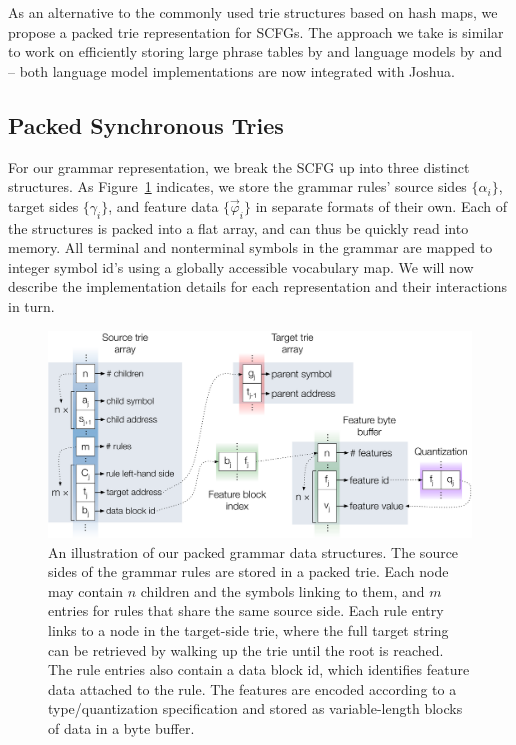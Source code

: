 \documentclass[11pt]{article}
\begin{document}
As an alternative to the commonly used trie structures based on hash
maps, we propose a packed trie representation for SCFGs. The approach
we take is similar to work on efficiently storing large phrase tables
by  and language models by  and
 -- both language model implementations are now
integrated with Joshua.

\subsection{Packed Synchronous Tries}

For our grammar representation, we break the SCFG up into three
distinct structures. As Figure~\ref{fig-packed-structure} indicates,
we store the grammar rules' source sides $\{\alpha_i\}$, target sides
$\{\gamma_i\}$, and feature data $\{\vec{\varphi}_i\}$ in separate
formats of their own. Each of the structures is packed into a flat
array, and can thus be quickly read into memory. All terminal and
nonterminal symbols in the grammar are mapped to integer symbol id's
using a globally accessible vocabulary map. We will now describe the
implementation details for each representation and their interactions
in turn.

\begin{figure}[!th]
\begin{center}
\includegraphics[width=0.9\linewidth]{figures/packed_structure.pdf}
\end{center}
\caption{An illustration of our packed grammar data structures. The
  source sides of the grammar rules are stored in a packed trie. Each
  node may contain $n$ children and the symbols linking to them, and
  $m$ entries for rules that share the same source side. Each rule
  entry links to a node in the target-side trie, where the full target
  string can be retrieved by walking up the trie until the root is
  reached. The rule entries also contain a data block id, which
  identifies feature data attached to the rule. The features are
  encoded according to a type/quantization specification and stored as
  variable-length blocks of data in a byte buffer.}
\label{fig-packed-structure}
\end{figure}
\end{document}
